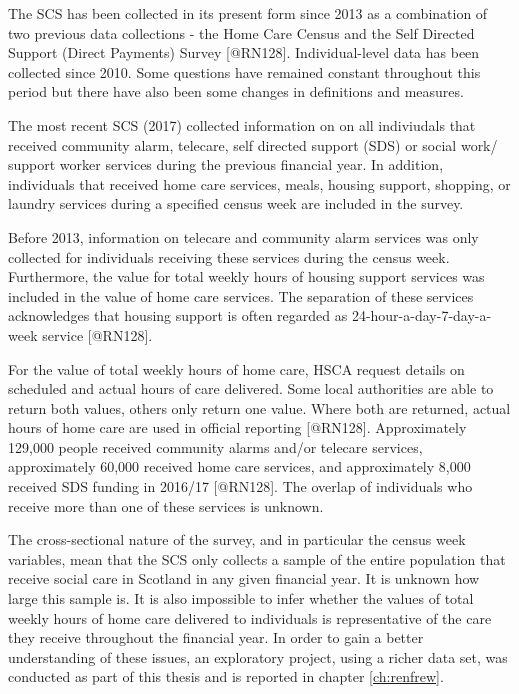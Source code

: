 \documentclass[]{article}
\begin{document}
The SCS has been collected in its present form since 2013 as a
combination of two previous data collections - the Home Care Census and
the Self Directed Support (Direct Payments) Survey {[}@RN128{]}.
Individual-level data has been collected since 2010. Some questions have
remained constant throughout this period but there have also been some
changes in definitions and measures.

The most recent SCS (2017) collected information on on all indiviudals
that received community alarm, telecare, self directed support (SDS) or
social work/ support worker services during the previous financial year.
In addition, individuals that received home care services, meals,
housing support, shopping, or laundry services during a specified census
week are included in the survey.

Before 2013, information on telecare and community alarm services was
only collected for individuals receiving these services during the
census week. Furthermore, the value for total weekly hours of housing
support services was included in the value of home care services. The
separation of these services acknowledges that housing support is often
regarded as 24-hour-a-day-7-day-a-week service {[}@RN128{]}.

For the value of total weekly hours of home care, HSCA request details
on scheduled and actual hours of care delivered. Some local authorities
are able to return both values, others only return one value. Where both
are returned, actual hours of home care are used in official reporting
{[}@RN128{]}. Approximately 129,000 people received community alarms
and/or telecare services, approximately 60,000 received home care
services, and approximately 8,000 received SDS funding in 2016/17
{[}@RN128{]}. The overlap of individuals who receive more than one of
these services is unknown.

The cross-sectional nature of the survey, and in particular the census
week variables, mean that the SCS only collects a sample of the entire
population that receive social care in Scotland in any given financial
year. It is unknown how large this sample is. It is also impossible to
infer whether the values of total weekly hours of home care delivered to
individuals is representative of the care they receive throughout the
financial year. In order to gain a better understanding of these issues,
an exploratory project, using a richer data set, was conducted as part
of this thesis and is reported in chapter \ref{ch:renfrew}.
\end{document}
